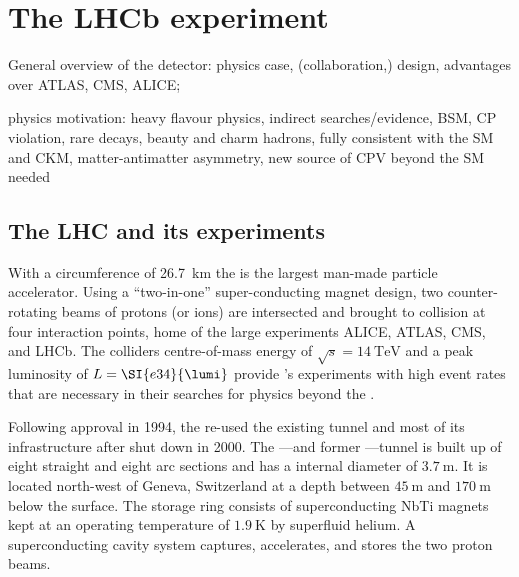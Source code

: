 
\chapter{The \acs*{LHCb} experiment}
\label{ch:lhcb_experiment}


General overview of the detector: physics case, (collaboration,) design, advantages over ATLAS, CMS, ALICE; 

physics motivation:
heavy flavour physics, indirect searches/evidence, BSM, CP violation, rare decays, beauty and charm hadrons, fully consistent with the SM and CKM, matter-antimatter asymmetry, new source of CPV beyond the SM needed

\section{The \acs*{LHC} and its experiments}
\label{sec:lhcb_experiment:lhc}

With a circumference of \SI{26.7}{\kilo\metre} the \LHC is the largest man-made
particle accelerator. Using a \enquote{two-in-one} super-conducting magnet
design, two counter-rotating beams of protons (or ions) are intersected and
brought to collision at four interaction points, home of the large \LHC
experiments \acs*{ALICE}, \acs*{ATLAS}, \acs*{CMS}, and \acs*{LHCb}. The
colliders centre-of-mass energy of $\sqrt{s}=\SI{14}{\TeV}$ and a peak
luminosity of $L=\SI{e34}{\lumi}$ provide \LHC's experiments with high event
rates that are necessary in their searches for physics beyond the \SM.

Following approval in 1994, the \LHC re-used the existing \LEP tunnel and most
of its infrastructure after \LEP shut down in 2000. The \LHC---and former
\LEP---tunnel is built up of eight straight and eight arc sections and has a
internal diameter of $\SI{3.7}{\metre}$. It is located north-west of Geneva,
Switzerland at a depth between $\SI{45}{\metre}$ and $\SI{170}{\metre}$ below
the surface. The storage ring consists of superconducting NbTi magnets kept at
an operating temperature of $\SI{1.9}{\kelvin}$ by superfluid helium. A
superconducting \RF cavity system captures, accelerates, and stores the two
proton beams.


